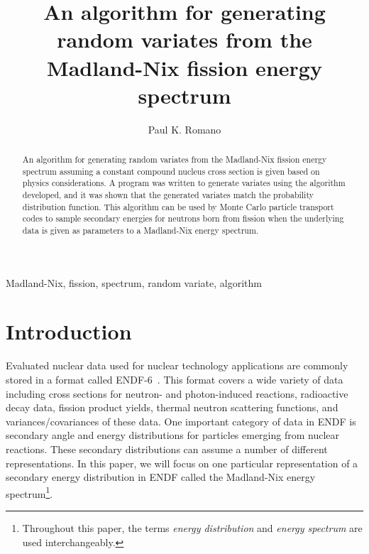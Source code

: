 \documentclass[3p,fleqn]{elsarticle}
\begin{document}
\title{An algorithm for generating random variates from the Madland-Nix fission
  energy spectrum}

\author{Paul K. Romano}

\address{Bechtel Marine Propulsion Corporation -- Knolls Atomic Power
  Laboratory \\ P.O. Box 1072, Schenectady, NY 12301, United States}

\begin{abstract}
  An algorithm for generating random variates from the Madland-Nix fission
  energy spectrum assuming a constant compound nucleus cross section is given
  based on physics considerations. A program was written to generate variates
  using the algorithm developed, and it was shown that the generated variates
  match the probability distribution function. This algorithm can be used by
  Monte Carlo particle transport codes to sample secondary energies for neutrons
  born from fission when the underlying data is given as parameters to a
  Madland-Nix energy spectrum.
\end{abstract}

\begin{keyword}
  Madland-Nix, fission, spectrum, random variate, algorithm
\end{keyword}

\maketitle

\section{Introduction}

Evaluated nuclear data used for nuclear technology applications are commonly
stored in a format called ENDF-6~\cite{bnl-trkov-2012}. This format covers a
wide variety of data including cross sections for neutron- and photon-induced
reactions, radioactive decay data, fission product yields, thermal neutron
scattering functions, and variances/covariances of these data. One important
category of data in ENDF is secondary angle and energy distributions for
particles emerging from nuclear reactions. These secondary distributions can
assume a number of different representations. In this paper, we will focus on
one particular representation of a secondary energy distribution in ENDF called
the Madland-Nix energy spectrum\footnote{Throughout this paper, the terms
  \textit{energy distribution} and \textit{energy spectrum} are used
  interchangeably.}.
\end{document}

